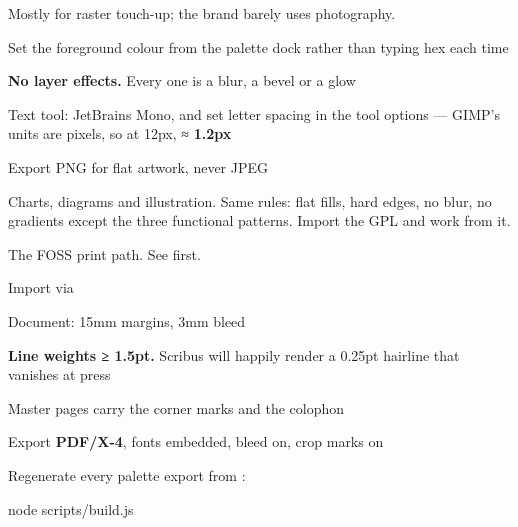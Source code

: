 \documentclass[fontpath=fonts/,logopath=logo/]{riposte-doc}
\begin{document}

Mostly for raster touch-up; the brand barely uses photography.

\begin{ripbullets}
\item Set the foreground colour from the palette dock rather than typing hex each time
\item \textbf{No layer effects.} Every one is a blur, a bevel or a glow
\item Text tool: JetBrains Mono, and set letter spacing in the tool options — GIMP's units are pixels, so at 12px, \ripmono{.1em} ≈ \textbf{1.2px}
\item Export PNG for flat artwork, never JPEG
\end{ripbullets}



Charts, diagrams and illustration. Same rules: flat fills, hard edges, no blur, no gradients except the three functional patterns. Import the GPL and work from it.



The FOSS print path. See  first.

\begin{ripbullets}
\item Import  via 
\item Document: 15mm margins, 3mm bleed
\item \textbf{Line weights ≥ 1.5pt.} Scribus will happily render a 0.25pt hairline that vanishes at press
\item Master pages carry the corner marks and the colophon
\item Export \textbf{PDF/X-4}, fonts embedded, bleed on, crop marks on
\end{ripbullets}



Regenerate every palette export from :

\ripcodeopen
{}
\begin{ripcodeblock}
node scripts/build.js
\end{ripcodeblock}
\ripcodesizereset\ripcodeclose
\end{document}
